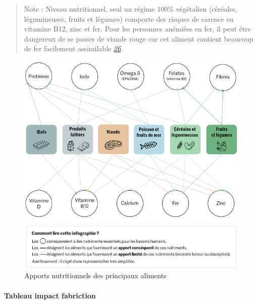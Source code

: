 \begin{quote}
Note : Niveau nutritionnel, seul un régime 100\% végétalien (céréales,
légumineuses, fruits et légumes) comporte des risques de carence en
vitamine B12, zinc et fer. Pour les personnes anémiées en fer, il peut
être dangereux de se passer de viande rouge car cet aliment contient
beaucoup de fer facilement assimilable
\emph{\href{https://www.lemonde.fr/les-decodeurs/article/2021/02/27/non-il-n-est-pas-necessaire-de-manger-de-la-viande-pour-etre-en-bonne-sante_6071378_4355770.html}{26}}.
\end{quote}

\begin{figure}
\centering
\includegraphics{img/infog2.png}
\caption{Apports nutritionnels des principaux aliments}
\end{figure}

\hypertarget{tableau-impact-fabriction}{%
\paragraph{Tableau impact fabriction}\label{tableau-impact-fabriction}}

